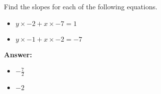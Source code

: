  Find the slopes for each of the following equations. \begin{itemize}\item \( y \times -2 + x \times -7 = 1 \)\item \( y \times -1 + x \times -2 = -7 \)\end{itemize}

        \textbf{Answer:} \begin{itemize}\item \( -\frac{7}{2} \)\item \( -2 \)\end{itemize}
